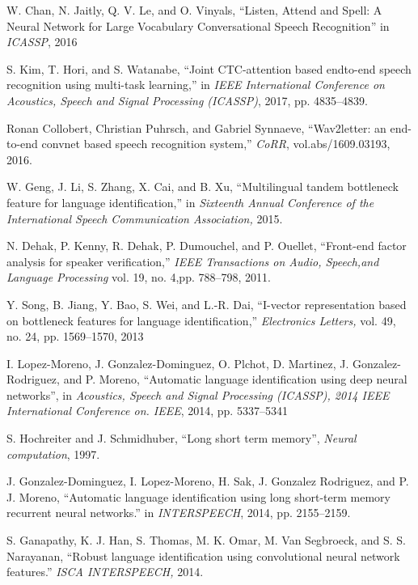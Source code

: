 \documentclass{article}
\begin{document}
\begin{thebibliography}{30}
\newcommand{\quotes}[1]{``#1''}

\bibitem{}
W. Chan, N. Jaitly, Q. V. Le, and O. Vinyals, \quotes{Listen, Attend
and Spell: A Neural Network for Large Vocabulary Conversational
Speech Recognition} in \textit{ICASSP}, 2016

\bibitem{}
S. Kim, T. Hori, and S. Watanabe, \quotes{Joint CTC-attention based endto-end speech recognition using multi-task learning,} in \textit{IEEE International Conference on Acoustics, Speech and Signal Processing (ICASSP)}, 2017, pp. 4835–4839.

\bibitem{}
Ronan Collobert, Christian Puhrsch, and Gabriel Synnaeve,
\quotes{Wav2letter: an end-to-end convnet based speech recognition system,} \textit{CoRR}, vol.abs/1609.03193, 2016.

\bibitem{}
W. Geng, J. Li, S. Zhang, X. Cai, and B. Xu, \quotes{Multilingual tandem
bottleneck feature for language identification,} in \textit{Sixteenth Annual
Conference of the International Speech Communication Association,} 2015.

\bibitem{}
N. Dehak, P. Kenny, R. Dehak, P. Dumouchel, and P. Ouellet,
\quotes{Front-end factor analysis for speaker verification,} \textit{IEEE Transactions on Audio, Speech,and Language Processing} vol. 19, no. 4,pp. 788–798, 2011.

\bibitem{}
Y. Song, B. Jiang, Y. Bao, S. Wei, and L.-R. Dai, \quotes{I-vector representation based on bottleneck features for language identification,}
\textit{Electronics Letters,} vol. 49, no. 24, pp. 1569–1570, 2013

\bibitem{}
I. Lopez-Moreno, J. Gonzalez-Dominguez, O. Plchot, D. Martinez,
J. Gonzalez-Rodriguez, and P. Moreno, \quotes{Automatic language identification using deep neural networks}, in \textit{Acoustics, Speech and Signal Processing (ICASSP), 2014 IEEE International Conference on. IEEE}, 2014, pp. 5337–5341

\bibitem{}
S. Hochreiter and J. Schmidhuber, \quotes{Long short term memory}, \textit{Neural computation}, 1997.

\bibitem{}
J. Gonzalez-Dominguez, I. Lopez-Moreno, H. Sak, J. Gonzalez Rodriguez, and P. J. Moreno, \quotes{Automatic language identification using long short-term memory recurrent neural networks.} in \textit{INTERSPEECH}, 2014, pp. 2155–2159.

\bibitem{}
S. Ganapathy, K. J. Han, S. Thomas, M. K. Omar, M. Van Segbroeck, and S. S. Narayanan, \quotes{Robust language identification using convolutional neural network features.} \textit{ISCA INTERSPEECH,}
2014.


\end{thebibliography}
\end{document}
